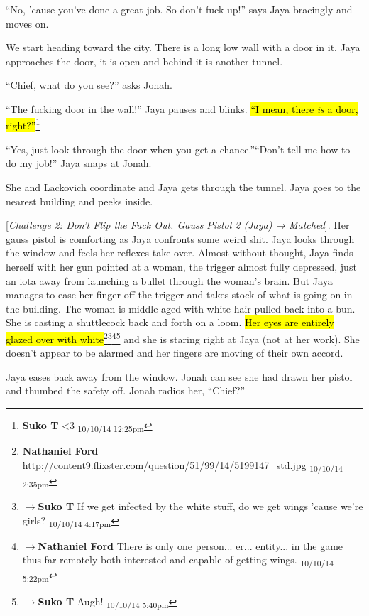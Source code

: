 ``No, 'cause you've done a great job.  So don't fuck up!'' says Jaya bracingly and moves on.





We start heading toward the city.  There is a long low wall with a door in it.  Jaya approaches the door, it is open and behind it is another tunnel.

``Chief, what do you see?'' asks Jonah.

``The fucking door in the wall!'' Jaya pauses and blinks.  \hl{``I mean, there \textit{is} a door, right?''}\footnote{\textbf{Suko T }\textless 3 \textsubscript{10/10/14 12:25pm}}

``Yes, just look through the door when you get a chance.''``Don't tell me how to do my job!'' Jaya snaps at Jonah.  

She and Lackovich coordinate and Jaya gets through the tunnel.  Jaya goes to the nearest building and peeks inside.

{[}\textit{Challenge 2: Don't Flip the Fuck Out.  Gauss Pistol 2 (Jaya) → Matched}{]}.   Her gauss pistol is comforting as Jaya confronts some weird shit.  Jaya looks through the window and feels her reflexes take over.  Almost without thought, Jaya finds herself with her gun pointed at a woman, the trigger almost fully depressed, just an iota away from launching a bullet through the woman's brain.  But Jaya manages to ease her finger off the trigger and takes stock of what is going on in the building.  The woman is middle-aged with white hair pulled back into a bun.  She is casting a shuttlecock back and forth on a loom.  \hl{Her eyes are entirely glazed over with white}\footnote{\textbf{Nathaniel Ford }http://content9.flixster.com/question/51/99/14/5199147\_std.jpg \textsubscript{10/10/14 2:35pm}}\footnote{$\rightarrow$\textbf{Suko T }If we get infected by the white stuff, do we get wings 'cause we're girls? \textsubscript{10/10/14 4:17pm}}\footnote{$\rightarrow$\textbf{Nathaniel Ford }There is only one person... er... entity... in the game thus far remotely both interested and capable of getting wings. \textsubscript{10/10/14 5:22pm}}\footnote{$\rightarrow$\textbf{Suko T }Augh!  \textsubscript{10/10/14 5:40pm}} and she is staring right at Jaya (not at her work).  She doesn't appear to be alarmed and her fingers are moving of their own accord.



Jaya eases back away from the window.  Jonah can see she had drawn her pistol and thumbed the safety off.  Jonah radios her, ``Chief?''

